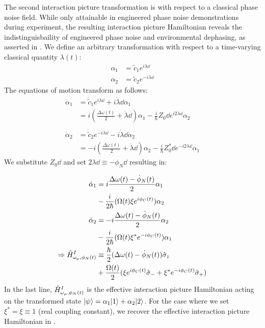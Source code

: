 The second interaction picture transformation is with respect to a classical phase noise field. While only attainable in engineered phase noise demonstrations during experiment, the resulting interaction picture Hamiltonian reveals the indistinguisbaility of engineered phase noise and environmental dephasing, as asserted in \cite{soare2014}. We define an arbitrary transformation with respect to a time-varying classical quantity $\lambda (t)$:
\begin{align}
\alpha_1 &= \tilde{c}_1e^{i\lambda\dd} \\
\alpha_2 &= \tilde{c}_2e^{-i\lambda\dd}
\end{align}
The equations of motion transform as follows:
\begin{align}
\dot{\alpha}_1 & = \dot{\tilde{c}}_1 e^{i \lambda\dd} + i \dot{\lambda}\dd \alpha_1 \nonumber \\
& =  i(\frac{\Delta \omega(t)}{2} + \dot{\lambda}\dd)\alpha_1 - \frac{i}{\hbar}Z_0\dd e^{i2\lambda\dd}\alpha_2 \\
& \nonumber \\
\dot{\alpha}_2 & = \dot{\tilde{c}}_2 e^{-i \lambda\dd} - i \dot{\lambda}\dd\dot{\alpha}_2 \nonumber \\
& =  -i(\frac{\Delta \omega(t)}{2} + \dot{\lambda}\dd)\alpha_2- \frac{i}{\hbar}Z_0^*\dd e^{-i2\lambda\dd}\alpha_1
\end{align}
We substitute $Z_0\dd$ and set $2\lambda\dd \equiv -\phi_N\dd$ resulting in:

\begin{align}
\dot{\alpha}_1 & =  i\frac{\Delta \omega(t) - \dot{\phi}_N \dd}{2}\alpha_1 \nonumber \\ %
& - \frac{i}{2\hbar}(\Omega\dd \xi e^{i\phi_C\dd}) \alpha_2  \\
\dot{\alpha}_2 & =  -i\frac{\Delta \omega(t) - \dot{\phi}_N\dd}{2}\alpha_2 \nonumber  \\ %
& - \frac{i}{2\hbar}(\Omega\dd \xi^* e^{-i\phi_C\dd})\alpha_1  \\
\Rightarrow \op{H}^{I}_{\omega_\mu,\phi_N\dd} &\equiv \frac{\hbar}{2}(\Delta \omega(t)- \dot{\phi}_N\dd)\p{z} \nonumber \\
& + \frac{\Omega\dd}{2} (\xi e^{i\phi_C\dd}\p{-} + \xi^* e^{-i\phi_C\dd}\p{+}) \label{eqn:Hi}
\end{align}
In the last line, $\hat{H}^{I}_{\omega_\mu,\phi_N(t)}$ is the effective interaction picture Hamiltonian acting on the transformed state $| \psi \rangle = \alpha_1| 1 \rangle + \alpha_2| 2 \rangle$. For the case where we set $\xi^* = \xi \equiv 1$ (real coupling constant), we recover the effective interaction picture Hamiltonian in \cite{soare2014}.

